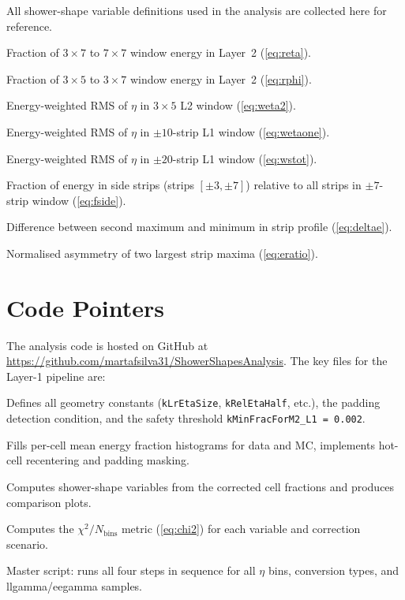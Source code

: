\documentclass[11pt,a4paper]{article}
\newcommand{\Reta}{R_{\eta}}
\newcommand{\Rphi}{R_{\phi}}
\newcommand{\weta}{w_{\eta 2}}
\newcommand{\wetaone}{w_{\eta 1}}
\newcommand{\wstot}{w_{s,\mathrm{tot}}}
\newcommand{\fside}{f_{\mathrm{side}}}
\newcommand{\dE}{\Delta E}
\newcommand{\Eratio}{E_{\mathrm{ratio}}}
\newcommand{\chisq}{\chi^2/N_\mathrm{bins}}
\begin{document}
All shower-shape variable definitions used in the analysis are
collected here for reference.

\begin{description}[labelindent=0pt,leftmargin=2em,style=unboxed]
  \item[$\Reta$] Fraction of $3\times7$ to $7\times7$ window energy
        in Layer~2 (\cref{eq:reta}).
  \item[$\Rphi$] Fraction of $3\times5$ to $3\times7$ window energy
        in Layer~2 (\cref{eq:rphi}).
  \item[$\weta$] Energy-weighted RMS of $\eta$ in $3\times5$ L2 window
        (\cref{eq:weta2}).
  \item[$\wetaone$] Energy-weighted RMS of $\eta$ in $\pm10$-strip L1
        window (\cref{eq:wetaone}).
  \item[$\wstot$] Energy-weighted RMS of $\eta$ in $\pm20$-strip L1
        window (\cref{eq:wstot}).
  \item[$\fside$] Fraction of energy in side strips (strips $[\pm3,\pm7]$)
        relative to all strips in $\pm7$-strip window (\cref{eq:fside}).
  \item[$\dE$] Difference between second maximum and minimum in strip
        profile (\cref{eq:deltae}).
  \item[$\Eratio$] Normalised asymmetry of two largest strip maxima
        (\cref{eq:eratio}).
\end{description}

\section{Code Pointers}
\label{app:code}

The analysis code is hosted on GitHub at
\url{https://github.com/martafsilva31/ShowerShapesAnalysis}.
The key files for the Layer-1 pipeline are:

\begin{description}[labelindent=0pt,leftmargin=2em,style=unboxed]
  \item[\texttt{config\_layer1.h}]
        Defines all geometry constants (\texttt{kLrEtaSize}, \texttt{kRelEtaHalf},
        etc.), the padding detection condition, and the safety threshold
        \texttt{kMinFracForM2\_L1 = 0.002}.
  \item[\texttt{fill\_histograms\_layer1.C}]
        Fills per-cell mean energy fraction histograms for data and MC,
        implements hot-cell recentering and padding masking.
  \item[\texttt{plot\_shower\_shapes\_layer1.C}]
        Computes shower-shape variables from the corrected cell fractions
        and produces comparison plots.
  \item[\texttt{extract\_chi2\_layer1.C}]
        Computes the $\chisq$ metric (\cref{eq:chi2}) for each variable
        and correction scenario.
  \item[\texttt{run\_layer1\_final.sh}]
        Master script: runs all four steps in sequence for all
        $\eta$ bins, conversion types, and llgamma/eegamma samples.
\end{description}
\end{document}
